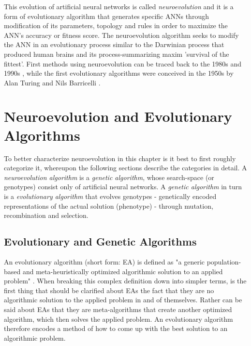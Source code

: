 \documentclass[journal, a4paper]{IEEEtran}
\begin{document}
This evolution of artificial neural networks is called \textit{neuroevolution} and it is a form of evolutionary algorithm that generates specific ANNs through modification of its parameters, topology and rules in order to maximize the ANN's accuracy or fitness score. The neuroevolution algorithm seeks to modify the ANN in an evolutionary process similar to the Darwinian process that produced human brains and its process-summarizing maxim 'survival of the fittest'. First methods using neuroevolution can be traced back to the 1980s and 1990s \cite{fro18}, while the first evolutionary algorithms were conceived in the 1950s by Alan Turing and Nils Barricelli \cite{tur50}.




\section{Neuroevolution and Evolutionary Algorithms}

To better characterize neuroevolution in this chapter is it best to first roughly categorize it, whereupon the following sections describe the categories in detail. A \textit{neuroevolution algorithm} is a \textit{genetic algorithm}, whose search-space (or genotypes) consist only of artificial neural networks. A \textit{genetic algorithm} in turn is a \textit{evolutionary algorithm} that evolves genotypes - genetically encoded representations of the actual solution (phenotype) - through mutation, recombination and selection.



\subsection{Evolutionary and Genetic Algorithms}

An evolutionary algorithm (short form: EA) is defined as "a generic population-based and meta-heuristically optimized algorithmic solution to an applied problem" \cite{hol12}. When breaking this complex definition down into simpler terms, is the first thing that should be clarified about EAs the fact that they are no algorithmic solution to the applied problem in and of themselves. Rather can be said about EAs that they are meta-algorithms that create another optimized algorithm, which then solves the applied problem. An evolutionary algorithm therefore encodes a method of how to come up with the best solution to an algorithmic problem.
\end{document}
